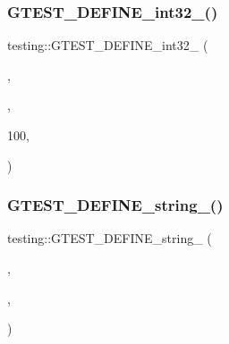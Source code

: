 \subsubsection{\texorpdfstring{G\+T\+E\+S\+T\+\_\+\+D\+E\+F\+I\+N\+E\+\_\+int32\+\_\+()}{GTEST\_DEFINE\_int32\_()}\hspace{0.1cm}{\footnotesize\ttfamily [3/3]}}
{\footnotesize\ttfamily testing\+::\+G\+T\+E\+S\+T\+\_\+\+D\+E\+F\+I\+N\+E\+\_\+int32\+\_\+ (\begin{DoxyParamCaption}\item[{stack\+\_\+trace\+\_\+depth}]{,  }\item[{\hyperlink{namespacetesting_1_1internal_a0f7e728793f9e6cb0aa2b69eaa468bf3}{internal\+::\+Int32\+From\+G\+Test\+Env}(\char`\"{}stack\+\_\+trace\+\_\+depth\char`\"{}, k\+Max\+Stack\+Trace\+Depth)}]{,  }\item[{\char`\"{}The maximum number of stack frames to print when an \char`\"{} \char`\"{}assertion fails. The valid range is 0 through}]{100,  }\item[{inclusive.\char`\"{}}]{ }\end{DoxyParamCaption})}

\mbox{\label{namespacetesting_a8e954ed3f0f6ca2e90b043e419c74123}} 
\subsubsection{\texorpdfstring{G\+T\+E\+S\+T\+\_\+\+D\+E\+F\+I\+N\+E\+\_\+string\+\_\+()}{GTEST\_DEFINE\_string\_()}\hspace{0.1cm}{\footnotesize\ttfamily [1/5]}}
{\footnotesize\ttfamily testing\+::\+G\+T\+E\+S\+T\+\_\+\+D\+E\+F\+I\+N\+E\+\_\+string\+\_\+ (\begin{DoxyParamCaption}\item[{death\+\_\+test\+\_\+style}]{,  }\item[{\hyperlink{namespacetesting_1_1internal_ac54dabc540bf79c2de91add679bfb93b}{internal\+::\+String\+From\+G\+Test\+Env}(\char`\"{}death\+\_\+test\+\_\+style\char`\"{}, k\+Default\+Death\+Test\+Style)}]{,  }\item[{\char`\"{}Indicates how to run a death test in a forked child process\+: \char`\"{} \char`\"{}\textbackslash{}eadsafe\textbackslash{}hild process re-\/executes the test binary \char`\"{} \char`\"{}from the beginning, running only the specific death test) or \char`\"{} \char`\"{}\textbackslash{}t\textbackslash{}hild process runs the death test immediately \char`\"{} \char`\"{}after forking).\char`\"{}}]{ }\end{DoxyParamCaption})}

